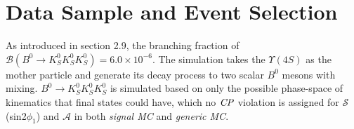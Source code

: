 \section{Data Sample and Event Selection}

As introduced in section 2.9, the branching fraction of $\mathcal{B}(B^0 \to K_S^0  K_S^0  K_S^0) = 6.0 \times 10^{-6}$. The simulation takes the $\Upsilon(4S)$ as the mother particle and generate its decay process to two scalar $B^0$ mesons with mixing. $B^0 \to K_S^0  K_S^0  K_S^0$ is simulated based on only the possible phase-space of kinematics that final states could have, which no $\it{CP}$ violation is assigned for $\mathcal{S}$(sin2$\phi_1$) and $\mathcal{A}$ in both \textit{signal MC} and \textit{generic MC}.

